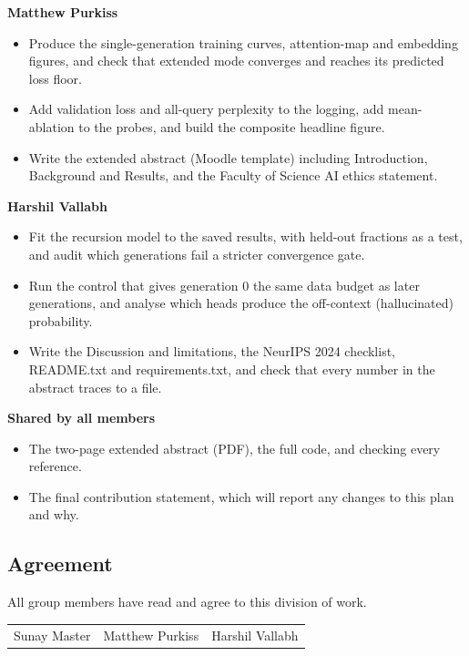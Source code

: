\documentclass[10pt,letterpaper]{article}
\begin{document}
\textbf{Matthew Purkiss}
\begin{itemize}
    \item Produce the single-generation training curves, attention-map and embedding figures, and check that extended mode converges and reaches its predicted loss floor.
    \item Add validation loss and all-query perplexity to the logging, add mean-ablation to the probes, and build the composite headline figure.
    \item Write the extended abstract (Moodle template) including Introduction, Background and Results, and the Faculty of Science AI ethics statement.
\end{itemize}

\textbf{Harshil Vallabh}
\begin{itemize}
    \item Fit the recursion model to the saved results, with held-out fractions as a test, and audit which generations fail a stricter convergence gate.
    \item Run the control that gives generation 0 the same data budget as later generations, and analyse which heads produce the off-context (hallucinated) probability.
    \item Write the Discussion and limitations, the NeurIPS 2024 checklist, README.txt and requirements.txt, and check that every number in the abstract traces to a file.
\end{itemize}

\textbf{Shared by all members}
\begin{itemize}
    \item The two-page extended abstract (PDF), the full code, and checking every reference.
    \item The final contribution statement, which will report any changes to this plan and why.
\end{itemize}

\subsection{Agreement}

All group members have read and agree to this division of work.

\vspace{0.5em}
\begin{tabular}{@{}p{}p{}p{}@{}}
Sunay Master & Matthew Purkiss & Harshil Vallabh \\
\end{tabular}
\endgroup

\twocolumn



\setlength{\bibleftmargin}{.125in}
\setlength{\bibindent}{-\bibleftmargin}



\onecolumn

\end{document}
